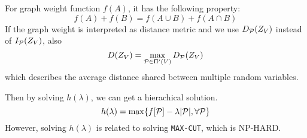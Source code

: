 \documentclass{article}
\begin{document}
For graph weight function $f(A)$, it has the following property:
\begin{equation}
f(A) + f(B) = f(A\cup B) + f(A \cap B)
\end{equation}
If the graph weight is interpreted as distance metric and we use $D_{\P}(Z_V)$ instead of $I_{\P}(Z_V)$,
also 
\begin{equation}
D(Z_V) = \max_{\P \in \Pi'(V)} D_{\P}(Z_V)
\end{equation}
which describes the average distance shared between multiple random variables.

Then by solving $h(\lambda)$, we can get a hierachical solution.
\begin{equation}
h(\lambda) = \max\{f[\P] - \lambda\abs{\P},\forall \P\}
\end{equation}
However, solving $h(\lambda)$ is related to solving \texttt{MAX-CUT}, which is NP-HARD.
\end{document}

